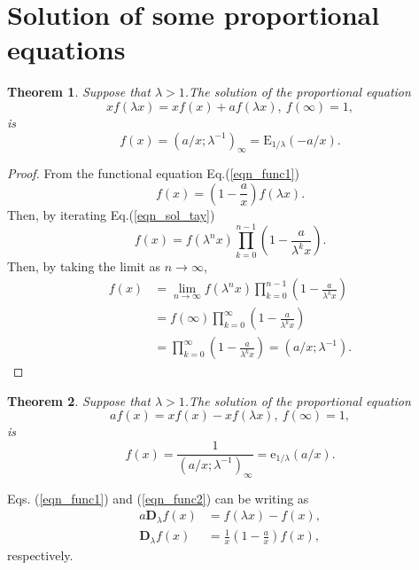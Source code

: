 \documentclass[12pt]{article}
\newcommand{\E}{\mathrm{E}}
\newcommand{\e}{\mathrm{e}}
\newcommand{\D}{\mathbf{D}}
\newtheorem{theorem}{Theorem}
\begin{document}





\section{Solution of some proportional equations}\label{sec4}

\begin{theorem}
Suppose that $\lambda>1$.The solution of the proportional equation 
\begin{equation}\label{eqn_func1}
    xf(\lambda x)=xf(x)+af(\lambda x),\ f(\infty)=1,
\end{equation}
is
\begin{equation}
    f(x)=(a/x;\lambda^{-1})_{\infty}=\E_{1/\lambda}(-a/x).
\end{equation}
\end{theorem}
\begin{proof}
From the functional equation Eq.(\ref{eqn_func1})
\begin{equation}\label{eqn_sol_tay}
    f(x)=\left(1-\frac{a}{x}\right)f(\lambda x).
\end{equation}
Then, by iterating Eq.(\ref{eqn_sol_tay})
\begin{equation}
    f(x)=f(\lambda^{n}x)\prod_{k=0}^{n-1}\left(1-\frac{a}{\lambda^{k}x}\right).
\end{equation}
Then, by taking the limit as $n\rightarrow\infty$,
\begin{align*}
    f(x)&=\lim_{n\rightarrow\infty}f(\lambda^nx)\prod_{k=0}^{n-1}\left(1-\frac{a}{\lambda^kx}\right)\\
    &=f(\infty)\prod_{k=0}^{\infty}\left(1-\frac{a}{\lambda^kx}\right)\\
    &=\prod_{k=0}^{\infty}\left(1-\frac{a}{\lambda^kx}\right)=(a/x;\lambda^{-1}).
\end{align*}
\end{proof}

\begin{theorem}
Suppose that $\lambda>1$.The solution of the proportional equation 
\begin{equation}\label{eqn_func2}
    af(x)=xf(x)-xf(\lambda x),\ f(\infty)=1,
\end{equation}
is
\begin{equation}
    f(x)=\frac{1}{(a/x;\lambda^{-1})_{\infty}}=\e_{1/\lambda}(a/x).
\end{equation}
\end{theorem}
Eqs. (\ref{eqn_func1}) and (\ref{eqn_func2}) can be writing as
\begin{align*}
    a\D_{\lambda}f(x)&=f(\lambda x)-f(x),\\
    \D_{\lambda}f(x)&=\frac{1}{x}\left(1-\frac{a}{x}\right)f(x),
\end{align*}
respectively.
\end{document}
